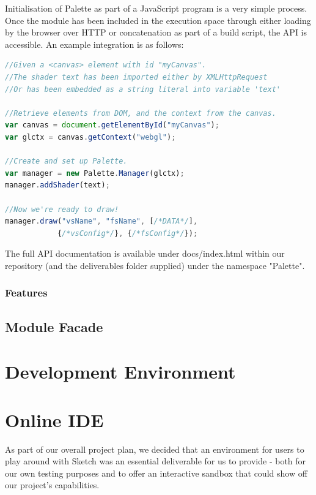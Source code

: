 \documentclass{l3proj}
\begin{document}
Initialisation of Palette as part of a JavaScript program is a very simple process. Once the module has been included in the execution space through either loading by the browser over HTTP or concatenation as part of a build script, the API is accessible. An example integration is as follows:
\begin{lstlisting}[caption={Palette Usage Example},label={lst:palette-example},language=JavaScript]
//Given a <canvas> element with id "myCanvas".
//The shader text has been imported either by XMLHttpRequest
//Or has been embedded as a string literal into variable 'text'

//Retrieve elements from DOM, and the context from the canvas.
var canvas = document.getElementById("myCanvas");
var glctx = canvas.getContext("webgl");

//Create and set up Palette.
var manager = new Palette.Manager(glctx);
manager.addShader(text);

//Now we're ready to draw!
manager.draw("vsName", "fsName", [/*DATA*/],
			{/*vsConfig*/}, {/*fsConfig*/});
\end{lstlisting}

The full API documentation is available under docs/index.html within our repository (and the deliverables folder supplied) under the namespace "Palette".
\subsection{Features}
\label{arch-shad-features}

\section{Module Facade}
\label{arch-module}

\chapter{Development Environment}
\label{dev}

\chapter{Online IDE}
\label{ide}
As part of our overall project plan, we decided that an environment for users to play around with Sketch was an essential deliverable for us to provide - both for our own testing purposes and to offer an interactive sandbox that could show off our project's capabilities.
\end{document}
